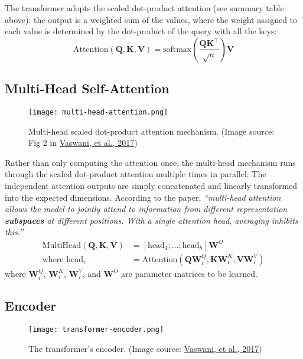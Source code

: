 \documentclass[12pt]{article}
\begin{document}
The transformer adopts the scaled dot-product attention (see summary table above): the output is a weighted sum of the values, where the weight assigned to each value is determined by the dot-product of the query with all the keys:
\[
\text{Attention}(\mathbf{Q}, \mathbf{K}, \mathbf{V}) = \text{softmax}\left(\frac{\mathbf{Q}\mathbf{K}^\top}{\sqrt{n}}\right)\mathbf{V}
\]

\subsection{Multi-Head Self-Attention}
\begin{figure}[H]
    \centering
    \texttt{[image: multi-head-attention.png]}
    \caption{Multi-head scaled dot-product attention mechanism. (Image source: Fig 2 in \href{http://papers.nips.cc/paper/7181-attention-is-all-you-need.pdf}{Vaswani, et al., 2017})}
\end{figure}

Rather than only computing the attention once, the multi-head mechanism runs through the scaled dot-product attention multiple times in parallel. The independent attention outputs are simply concatenated and linearly transformed into the expected dimensions. According to the paper, \emph{``multi-head attention allows the model to jointly attend to information from different representation \textbf{subspaces} at different positions. With a single attention head, averaging inhibits this.''}
\[
\begin{aligned}
\text{MultiHead}(\mathbf{Q}, \mathbf{K}, \mathbf{V}) &= [\text{head}_1; \dots; \text{head}_h]\mathbf{W}^O \\
\text{where head}_i &= \text{Attention}(\mathbf{Q}\mathbf{W}^Q_i, \mathbf{K}\mathbf{W}^K_i, \mathbf{V}\mathbf{W}^V_i)
\end{aligned}
\]
where $\mathbf{W}^Q_i$, $\mathbf{W}^K_i$, $\mathbf{W}^V_i$, and $\mathbf{W}^O$ are parameter matrices to be learned.

\subsection{Encoder}
\begin{figure}[H]
    \centering
    \texttt{[image: transformer-encoder.png]}
    \caption{The transformer's encoder. (Image source: \href{http://papers.nips.cc/paper/7181-attention-is-all-you-need.pdf}{Vaswani, et al., 2017})}
\end{figure}
\end{document}
